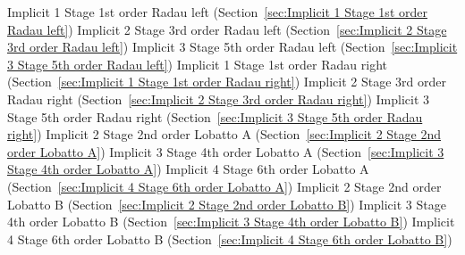 \begin{list}{}
      \newline 
    Implicit 1 Stage 1st order Radau left (Section~\ref{sec:Implicit 1 Stage 1st order Radau left})
      \newline 
    Implicit 2 Stage 3rd order Radau left (Section~\ref{sec:Implicit 2 Stage 3rd order Radau left})
      \newline 
    Implicit 3 Stage 5th order Radau left (Section~\ref{sec:Implicit 3 Stage 5th order Radau left})
      \newline 
    Implicit 1 Stage 1st order Radau right (Section~\ref{sec:Implicit 1 Stage 1st order Radau right})
      \newline 
    Implicit 2 Stage 3rd order Radau right (Section~\ref{sec:Implicit 2 Stage 3rd order Radau right})
      \newline 
    Implicit 3 Stage 5th order Radau right (Section~\ref{sec:Implicit 3 Stage 5th order Radau right})
      \newline 
    Implicit 2 Stage 2nd order Lobatto A (Section~\ref{sec:Implicit 2 Stage 2nd order Lobatto A})
      \newline 
    Implicit 3 Stage 4th order Lobatto A (Section~\ref{sec:Implicit 3 Stage 4th order Lobatto A})
      \newline 
    Implicit 4 Stage 6th order Lobatto A (Section~\ref{sec:Implicit 4 Stage 6th order Lobatto A})
      \newline 
    Implicit 2 Stage 2nd order Lobatto B (Section~\ref{sec:Implicit 2 Stage 2nd order Lobatto B})
      \newline 
    Implicit 3 Stage 4th order Lobatto B (Section~\ref{sec:Implicit 3 Stage 4th order Lobatto B})
      \newline 
    Implicit 4 Stage 6th order Lobatto B (Section~\ref{sec:Implicit 4 Stage 6th order Lobatto B})
      \newline 

\end{list}
